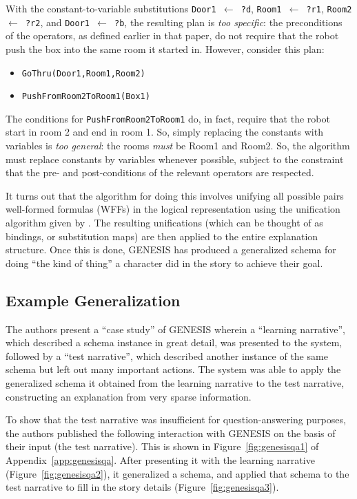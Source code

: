 With the constant-to-variable substitutions \texttt{Door1 $\gets$ ?d}, \texttt{Room1 $\gets$ ?r1}, \texttt{Room2 $\gets$ ?r2}, and \texttt{Door1 $\gets$ ?b}, the resulting plan is \textit{too specific}: the preconditions of the operators, as defined earlier in that paper, do not require that the robot push the box into the same room it started in. However, consider this plan:

\begin{itemize}
    \item \texttt{GoThru(Door1,Room1,Room2)}
    \item \texttt{PushFromRoom2ToRoom1(Box1)}
\end{itemize}

The conditions for \texttt{PushFromRoom2ToRoom1} do, in fact, require that the robot start in room 2 and end in room 1. So, simply replacing the constants with variables is \textit{too general}: the rooms \textit{must} be Room1 and Room2. So, the algorithm must replace constants by variables whenever possible, subject to the constraint that the pre- and post-conditions of the relevant operators are respected.

It turns out that the algorithm for doing this involves unifying all possible pairs well-formed formulas (WFFs) in the logical representation using the unification algorithm given by \citep{robinson1965machine}. The resulting unifications (which can be thought of as bindings, or substitution maps) are then applied to the entire explanation structure. Once this is done, GENESIS has produced a generalized schema for doing ``the kind of thing'' a character did in the story to achieve their goal.

\subsection{Example Generalization}
\label{sec:genesiseg}

The authors present a ``case study'' of GENESIS wherein a ``learning narrative'', which described a schema instance in great detail, was presented to the system, followed by a ``test narrative'', which described another instance of the same schema but left out many important actions. The system was able to apply the generalized schema it obtained from the learning narrative to the test narrative, constructing an explanation from very sparse information.

To show that the test narrative was insufficient for question-answering purposes, the authors published the following interaction with GENESIS on the basis of their input (the test narrative). This is shown in Figure~\ref{fig:genesisqa1} of Appendix~\ref{app:genesisqa}. After presenting it with the learning narrative (Figure~\ref{fig:genesisqa2}), it generalized a schema, and applied that schema to the test narrative to fill in the story details (Figure~\ref{fig:genesisqa3}).


